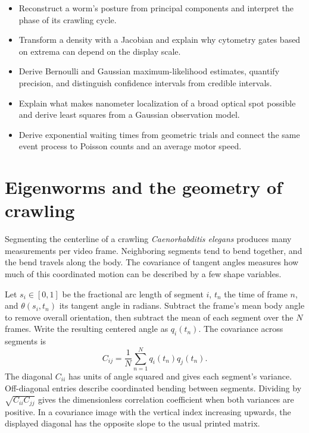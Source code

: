\begin{itemize}
\item Reconstruct a worm's posture from principal components and interpret the phase of its crawling cycle.
\item Transform a density with a Jacobian and explain why cytometry gates based on extrema can depend on the display scale.
\item Derive Bernoulli and Gaussian maximum-likelihood estimates, quantify precision, and distinguish confidence intervals from credible intervals.
\item Explain what makes nanometer localization of a broad optical spot possible and derive least squares from a Gaussian observation model.
\item Derive exponential waiting times from geometric trials and connect the same event process to Poisson counts and an average motor speed.
\end{itemize}

\section{Eigenworms and the geometry of crawling}
\label{sec:l06-eigenworms}

Segmenting the centerline of a crawling \textit{Caenorhabditis elegans} produces many measurements per video frame. Neighboring segments tend to bend together, and the bend travels along the body. The covariance of tangent angles measures how much of this coordinated motion can be described by a few shape variables.

Let $s_i\in[0,1]$ be the fractional arc length of segment $i$, $t_n$ the time of frame $n$, and $\theta(s_i,t_n)$ its tangent angle in radians. Subtract the frame's mean body angle to remove overall orientation, then subtract the mean of each segment over the $N$ frames. Write the resulting centered angle as $q_i(t_n)$. The covariance across segments is
\begin{equation}
 C_{ij}=\frac{1}{N}\sum_{n=1}^{N}q_i(t_n)q_j(t_n).
 \label{eq:l06-worm-covariance}
\end{equation}
The diagonal $C_{ii}$ has units of angle squared and gives each segment's variance. Off-diagonal entries describe coordinated bending between segments. Dividing by $\sqrt{C_{ii}C_{jj}}$ gives the dimensionless correlation coefficient when both variances are positive. In a covariance image with the vertical index increasing upwards, the displayed diagonal has the opposite slope to the usual printed matrix.

